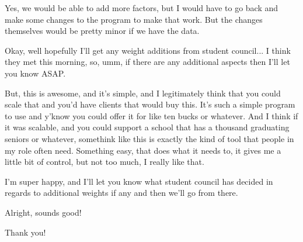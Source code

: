 \documentclass[appendix.tex]{subfiles}
\begin{document}
\begin{interviewer}
Yes, we would be able to add more factors, but I would have to go back and make some changes to the program to make that work.
But the changes themselves would be pretty minor if we have the data.
\end{interviewer}

\begin{client}
Okay, well hopefully I'll get any weight additions from student council... I think they met this morning, so, umm, if there are any additional aspects then I'll let you know ASAP.

But, this is awesome, and it's simple, and I legitimately think that you could scale that and you'd have clients that would buy this.
It's such a simple program to use and y'know you could offer it for like ten bucks or whatever.
And I think if it was scalable, and you could support a school that has a thousand graduating seniors or whatever, somethink like this is exactly the kind of tool that people in my role often need.
Something easy, that does what it needs to, it gives me a little bit of control, but not too much, I really like that.

I'm super happy, and I'll let you know what student council has decided in regards to additional weights if any and then we'll go from there.
\end{client}

\begin{interviewer}
Alright, sounds good!

Thank you!
\end{interviewer}
\end{document}
